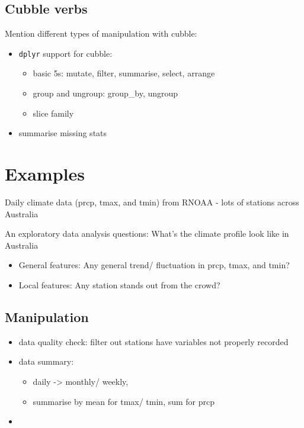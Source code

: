 \documentclass{article}
\begin{document}
\hypertarget{cubble-verbs}{%
\subsection{Cubble verbs}\label{cubble-verbs}}

Mention different types of manipulation with cubble:

\begin{itemize}
\tightlist
\item
  \texttt{dplyr} support for cubble:

  \begin{itemize}
  \tightlist
  \item
    basic 5s: mutate, filter, summarise, select, arrange
  \item
    group and ungroup: group\_by, ungroup
  \item
    slice family
  \end{itemize}
\item
  summarise missing stats
\end{itemize}

\hypertarget{examples}{%
\section{Examples}\label{examples}}

Daily climate data (prcp, tmax, and tmin) from RNOAA - lots of stations
across Australia

An exploratory data analysis questions: What's the climate profile look
like in Australia

\begin{itemize}
\tightlist
\item
  General features: Any general trend/ fluctuation in prcp, tmax, and
  tmin?
\item
  Local features: Any station stands out from the crowd?
\end{itemize}

\hypertarget{manipulation}{%
\subsection{Manipulation}\label{manipulation}}

\begin{itemize}
\tightlist
\item
  data quality check: filter out stations have variables not properly
  recorded
\item
  data summary:

  \begin{itemize}
  \tightlist
  \item
    daily -\textgreater{} monthly/ weekly,
  \item
    summarise by mean for tmax/ tmin, sum for prcp
  \end{itemize}
\item
\end{itemize}
\end{document}
